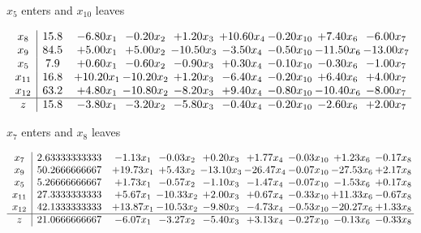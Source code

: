 \documentclass[9pt]{article}
\begin{document}
 $ x_{5} $ enters and $ x_{10} $ leaves 

 \[\begin{array}{c| c c@{\hskip 2pt} c@{\hskip 2pt} c@{\hskip 2pt} c@{\hskip 2pt} c@{\hskip 2pt} c@{\hskip 2pt} c@{\hskip 2pt} }
 x_{8}   &  15.8 & -6.80 x_{1} & -0.20 x_{2} & +  1.20 x_{3} & + 10.60 x_{4} & -0.20 x_{10} & +  7.40 x_{6} & -6.00 x_{7}\\
 x_{9}   &  84.5 & +  5.00 x_{1} & +  5.00 x_{2} & -10.50 x_{3} & -3.50 x_{4} & -0.50 x_{10} & -11.50 x_{6} & -13.00 x_{7}\\
 x_{5}   &  7.9 & +  0.60 x_{1} & -0.60 x_{2} & -0.90 x_{3} & +  0.30 x_{4} & -0.10 x_{10} & -0.30 x_{6} & -1.00 x_{7}\\
 x_{11}   &  16.8 & + 10.20 x_{1} & -10.20 x_{2} & +  1.20 x_{3} & -6.40 x_{4} & -0.20 x_{10} & +  6.40 x_{6} & +  4.00 x_{7}\\
 x_{12}   &  63.2 & +  4.80 x_{1} & -10.80 x_{2} & -8.20 x_{3} & +  9.40 x_{4} & -0.80 x_{10} & -10.40 x_{6} & -8.00 x_{7}\\
\hline
z    &  15.8 & -3.80 x_{1} & -3.20 x_{2} & -5.80 x_{3} & -0.40 x_{4} & -0.20 x_{10} & -2.60 x_{6} & +  2.00 x_{7}\\
\end{array}\]


 $ x_{7} $ enters and $ x_{8} $ leaves 

 \[\begin{array}{c| c c@{\hskip 2pt} c@{\hskip 2pt} c@{\hskip 2pt} c@{\hskip 2pt} c@{\hskip 2pt} c@{\hskip 2pt} c@{\hskip 2pt} }
 x_{7}   &  2.63333333333 & -1.13 x_{1} & -0.03 x_{2} & +  0.20 x_{3} & +  1.77 x_{4} & -0.03 x_{10} & +  1.23 x_{6} & -0.17 x_{8}\\
 x_{9}   &  50.2666666667 & + 19.73 x_{1} & +  5.43 x_{2} & -13.10 x_{3} & -26.47 x_{4} & -0.07 x_{10} & -27.53 x_{6} & +  2.17 x_{8}\\
 x_{5}   &  5.26666666667 & +  1.73 x_{1} & -0.57 x_{2} & -1.10 x_{3} & -1.47 x_{4} & -0.07 x_{10} & -1.53 x_{6} & +  0.17 x_{8}\\
 x_{11}   &  27.3333333333 & +  5.67 x_{1} & -10.33 x_{2} & +  2.00 x_{3} & +  0.67 x_{4} & -0.33 x_{10} & + 11.33 x_{6} & -0.67 x_{8}\\
 x_{12}   &  42.1333333333 & + 13.87 x_{1} & -10.53 x_{2} & -9.80 x_{3} & -4.73 x_{4} & -0.53 x_{10} & -20.27 x_{6} & +  1.33 x_{8}\\
\hline
z    &  21.0666666667 & -6.07 x_{1} & -3.27 x_{2} & -5.40 x_{3} & +  3.13 x_{4} & -0.27 x_{10} & -0.13 x_{6} & -0.33 x_{8}\\
\end{array}\]
\end{document}
